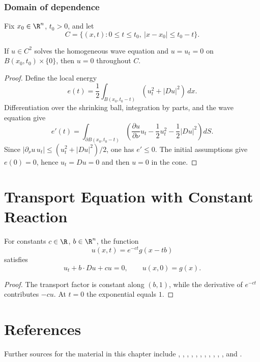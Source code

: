\subsubsection{Domain of dependence}
\label{sec:wave-domain-of-dependence}

Fix $x_0\in\R^n$, $t_0>0$, and let
$$C=\{(x,t):0\le t\le t_0,\ |x-x_0|\le t_0-t\}.$$

\begin{theorem}
\label{thm:wave-equation-finite-propagation-speed}
If $u\in C^2$ solves the homogeneous wave equation and
$u=u_t=0$ on $B(x_0,t_0)\times\{0\}$, then $u=0$ throughout $C$.
\end{theorem}
\begin{proof}
\sketch Define the local energy
$$e(t)=\frac12\int_{B(x_0,t_0-t)}(u_t^2+|Du|^2)\,dx.$$
Differentiation over the shrinking ball, integration by parts, and the wave
equation give
$$e'(t)=\int_{\partial B(x_0,t_0-t)}
\left(\frac{\partial u}{\partial\nu}u_t-\frac12u_t^2-\frac12|Du|^2\right)dS.$$
Since $|\partial_\nu u\,u_t|\le(u_t^2+|Du|^2)/2$, one has $e'\le0$.
The initial assumptions give $e(0)=0$, hence $u_t=Du=0$ and then $u=0$ in
the cone.
\end{proof}

\section{Transport Equation with Constant Reaction}
\label{sec:transport-equation-constant-reaction}

\begin{theorem}
\label{ex:transport-reaction-equation}
\leanok
For constants $c\in\R$, $b\in\R^n$, the function
$$u(x,t)=e^{-ct}g(x-tb)$$
satisfies
$$u_t+b\cdot Du+cu=0,
\qquad
u(x,0)=g(x).$$
\end{theorem}
\begin{proof}
\leanok
\sketch The transport factor is constant along $(b,1)$, while the derivative
of $e^{-ct}$ contributes $-cu$. At $t=0$ the exponential equals $1$.
\end{proof}

\section{References}
\label{sec:chapter2-references}

Further sources for the material in this chapter include
\cite{FeynmanLeightonSands1966},
\cite{GilbargTrudinger1983},
\cite{Mikhailov1978},
\cite{John1982}, \cite{Friedman1964},
\cite{Watson1973}, \cite{John1982}, \cite{Mikhailov1978},
\cite{Payne1975}, \cite{Antman1980}, \cite{Folland1976}, and
\cite{Strauss1992}.
